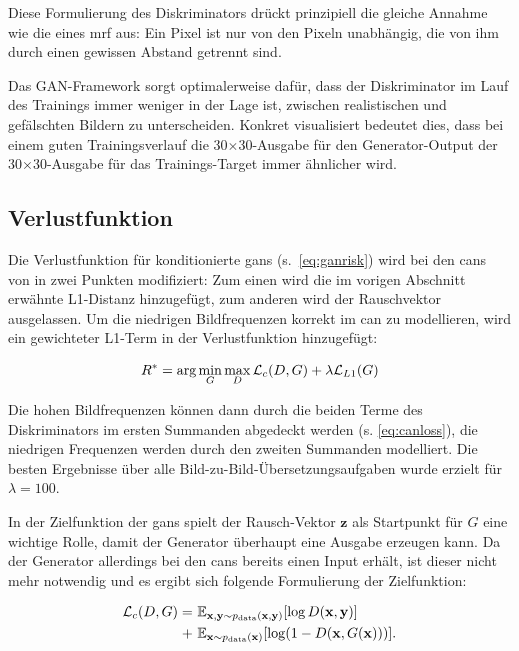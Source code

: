 Diese Formulierung des Diskriminators drückt prinzipiell die gleiche Annahme wie die eines \gls{mrf} aus:
Ein Pixel ist nur von den Pixeln unabhängig, die von ihm durch einen gewissen Abstand getrennt sind.

Das GAN-Framework sorgt optimalerweise dafür, dass der Diskriminator im Lauf des Trainings immer weniger in der Lage ist, zwischen realistischen und gefälschten Bildern zu unterscheiden.
Konkret visualisiert bedeutet dies, dass bei einem guten Trainingsverlauf die 30$\times$30-Ausgabe für den Generator-Output der 30$\times$30-Ausgabe für das Trainings-Target immer ähnlicher wird.



\subsection{Verlustfunktion}

Die Verlustfunktion für konditionierte \glspl{gan} (s.~\autoref{eq:ganrisk}) wird bei den \glspl{can} von \citeauthor{Isola.2017} in zwei Punkten modifiziert:
Zum einen wird die im vorigen Abschnitt erwähnte L1-Distanz hinzugefügt, zum anderen wird der Rauschvektor ausgelassen.
Um die niedrigen Bildfrequenzen korrekt im \gls{can} zu modellieren, wird ein gewichteter L1-Term in der Verlustfunktion hinzugefügt:

\begin{equation}
R^* = \textup{arg}\min_G \max_D \mathcal{L}_c(D, G) + \lambda \mathcal{L}_{L1}(G)
\end{equation}

Die hohen Bildfrequenzen können dann durch die beiden Terme des Diskriminators im ersten Summanden abgedeckt werden (s. \autoref{eq:canloss}), die niedrigen Frequenzen werden durch den zweiten Summanden modelliert.
Die besten Ergebnisse über alle Bild-zu-Bild-Übersetzungsaufgaben wurde erzielt für $ \lambda = 100 $.

In der Zielfunktion der \glspl{gan} spielt der Rausch-Vektor $ \mathbf{z} $ als Startpunkt für $ G $ eine wichtige Rolle, damit der Generator überhaupt eine Ausgabe erzeugen kann.
Da der Generator allerdings bei den \glspl{can} bereits einen Input erhält, ist dieser nicht mehr notwendig und es ergibt sich folgende Formulierung der Zielfunktion:

\begin{equation}\label{eq:canlosswonoise}
\begin{split}
\mathcal{L}_c(D, G) = & \ \mathbb{E}_{\mathbf{x}, \mathbf{y} \sim p_{\textup{data}}(\mathbf{x}, \mathbf{y})} [\log D(\mathbf{x}, \mathbf{y})] \\
+ & \ \mathbb{E}_{\mathbf{x} \sim p_{\textup{data}}(\mathbf{x})} [\log(1 - D(\mathbf{x}, G(\mathbf{x})))].
\end{split}
\end{equation}

